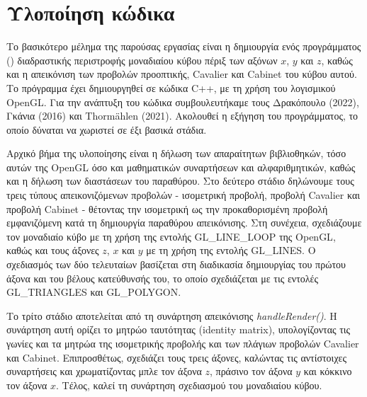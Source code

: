 \chapter{Υλοποίηση κώδικα}

Το βασικότερο μέλημα της παρούσας εργασίας είναι η δημιουργία ενός προγράμματος () διαδραστικής περιστροφής μοναδιαίου κύβου πέριξ των αξόνων $x$, $y$ και $z$, καθώς και η απεικόνιση των προβολών προοπτικής, \textlatin{Cavalier} και \textlatin{Cabinet} του κύβου αυτού. Το πρόγραμμα έχει δημιουργηθεί σε κώδικα \textlatin{C++}, με τη χρήση του λογισμικού \textlatin{OpenGL}. Για την ανάπτυξη του κώδικα συμβουλευτήκαμε τους Δρακόπουλο (2022), Γκάνια (2016) και \textlatin{Thormählen} (2021). Ακολουθεί η εξήγηση του προγράμματος, το οποίο δύναται να χωριστεί σε έξι βασικά στάδια. \par

Αρχικό βήμα της υλοποίησης είναι η δήλωση των απαραίτητων βιβλιοθηκών, τόσο αυτών της \textlatin{OpenGL} όσο και μαθηματικών συναρτήσεων και αλφαριθμητικών, καθώς και η δήλωση των διαστάσεων του παραθύρου. Στο δεύτερο στάδιο δηλώνουμε τους τρεις τύπους απεικονιζόμενων προβολών - ισομετρική προβολή, προβολή \textlatin{Cavalier} και προβολή \textlatin{Cabinet} - θέτοντας την ισομετρική ως την προκαθορισμένη προβολή εμφανιζόμενη κατά τη δημιουργία παραθύρου απεικόνισης. Στη συνέχεια, σχεδιάζουμε τον μοναδιαίο κύβο με τη χρήση της εντολής \textlatin{GL\_LINE\_LOOP} της \textlatin{OpenGL}, καθώς και τους άξονες $z$, $x$ και $y$ με τη χρήση της εντολής \textlatin{GL\_LINES}. Ο σχεδιασμός των δύο τελευταίων βασίζεται στη διαδικασία δημιουργίας του πρώτου άξονα και του βέλους κατεύθυνσής του, το οποίο σχεδιάζεται με τις εντολές \textlatin{GL\_TRIANGLES} και \textlatin{GL\_POLYGON}. \par

Το τρίτο στάδιο αποτελείται από τη συνάρτηση απεικόνισης \emph{\textlatin{handleRender()}}. Η συνάρτηση αυτή ορίζει το μητρώο ταυτότητας (\textlatin{identity matrix}), υπολογίζοντας τις γωνίες και τα μητρώα της ισομετρικής προβολής και των πλάγιων προβολών \textlatin{Cavalier} και \textlatin{Cabinet}. Επιπροσθέτως, σχεδιάζει τους τρεις άξονες, καλώντας τις αντίστοιχες συναρτήσεις και χρωματίζοντας μπλε τον άξονα $z$, πράσινο τον άξονα $y$ και κόκκινο τον άξονα $x$. Τέλος, καλεί τη συνάρτηση σχεδιασμού του μοναδιαίου κύβου. \par

